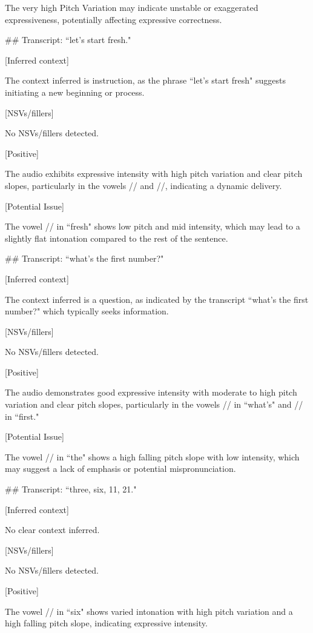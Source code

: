 \begin{tcolorbox}[blue_box, title = {{Audio Sample 2 : Ground-truth Human-likeness Rating = 3.0}}]
The very high Pitch Variation may indicate unstable or exaggerated expressiveness, potentially affecting expressive correctness.


\#\# Transcript: ``let's start fresh."

[Inferred context]  

The context inferred is instruction, as the phrase ``let's start fresh" suggests initiating a new beginning or process.


[NSVs/fillers]  

No NSVs/fillers detected.


[Positive]  

The audio exhibits expressive intensity with high pitch variation and clear pitch slopes, particularly in the vowels // and //, indicating a dynamic delivery.


[Potential Issue]  

The vowel // in ``fresh" shows low pitch and mid intensity, which may lead to a slightly flat intonation compared to the rest of the sentence.


\#\# Transcript: ``what's the first number?"

[Inferred context]  

The context inferred is a question, as indicated by the transcript ``what's the first number?" which typically seeks information.


[NSVs/fillers]  

No NSVs/fillers detected.


[Positive]  

The audio demonstrates good expressive intensity with moderate to high pitch variation and clear pitch slopes, particularly in the vowels // in ``what's" and // in ``first."


[Potential Issue]  

The vowel // in ``the" shows a high falling pitch slope with low intensity, which may suggest a lack of emphasis or potential mispronunciation.


\#\# Transcript: ``three, six, 11, 21."

[Inferred context]  

No clear context inferred.


[NSVs/fillers]  

No NSVs/fillers detected.


[Positive]  

The vowel // in ``six" shows varied intonation with high pitch variation and a high falling pitch slope, indicating expressive intensity.



\end{tcolorbox}
